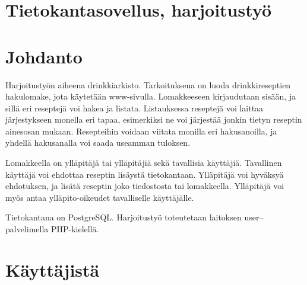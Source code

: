 \documentclass[a4paper]{article}
\begin{document}
\section*{Tietokantasovellus, harjoitustyö}
\section{Johdanto}

Harjoitustyön aiheena drinkkiarkisto. Tarkoituksena on luoda drinkkireseptien hakulomake, jota käytetään www-sivulla. Lomakkeeseen kirjaudutaan sisään, ja sillä eri reseptejä voi hakea ja listata. Listauksessa reseptejä voi laittaa järjestykseen monella eri tapaa, esimerkiksi ne voi järjestää jonkin tietyn reseptin ainesosan mukaan. Resepteihin voidaan viitata monilla eri hakusanoilla, ja yhdellä hakusanalla voi saada useamman tuloksen. 

Lomakkeella on ylläpitäjä tai ylläpitäjiä sekä tavallisia käyttäjiä. Tavallinen käyttäjä voi ehdottaa reseptin lisäystä tietokantaan. Ylläpitäjä voi hyväksyä ehdotuksen, ja lisätä reseptin joko tiedostosta tai lomakkeella. Ylläpitäjä voi myös antaa ylläpito-oikeudet tavalliselle käyttäjälle. 

Tietokantana on PostgreSQL. Harjoitustyö toteutetaan laitoksen user--palvelimella PHP-kielellä. 

%

\section{Käyttäjistä}
\end{document}
